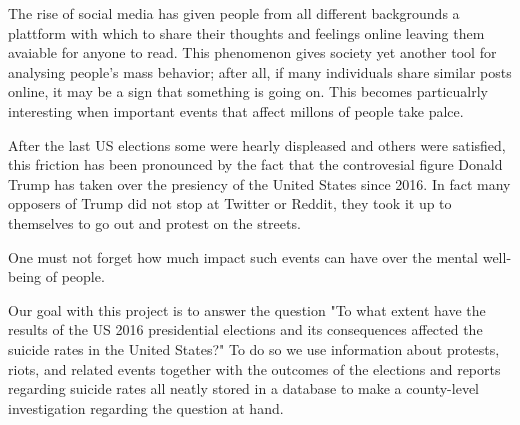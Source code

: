 The rise of social media has given people from all different
backgrounds a plattform with which to share their thoughts
and feelings online leaving them avaiable for anyone to read.
This phenomenon gives society yet another tool for analysing
people's mass behavior; after all, if many individuals share
similar posts online, it may be a sign that something
is going on.
This becomes particualrly interesting
when important events that affect millons of people take
palce.

After the last US elections
some were hearly displeased and others were
satisfied, this friction has been pronounced by the fact
that the controvesial figure Donald Trump has taken over
the presiency of the United States since 2016. In fact many opposers of Trump did not stop at Twitter or Reddit, they
took it up to themselves to go out and protest on the streets.

One must not forget how much impact such events can have over
the mental well-being of people.

Our goal with this project is to answer the question
"To what extent have the results of the US 2016 presidential
elections and its consequences
affected the suicide rates in the United States?"
To do so we use information about protests, riots, and
related events together with the outcomes of the elections
and reports regarding suicide rates all neatly stored in a database
to make a county-level investigation
regarding the question at hand.




